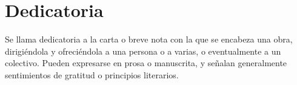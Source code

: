 \thispagestyle{plain}			%
\section*{Dedicatoria}
Se llama dedicatoria a la carta o breve nota con la que se encabeza una obra, dirigiéndola y ofreciéndola a una persona o a varias, o eventualmente a un colectivo. Pueden expresarse en prosa o manuscrita, y señalan generalmente sentimientos de gratitud o principios literarios.



\thispagestyle{empty}
\mbox{}